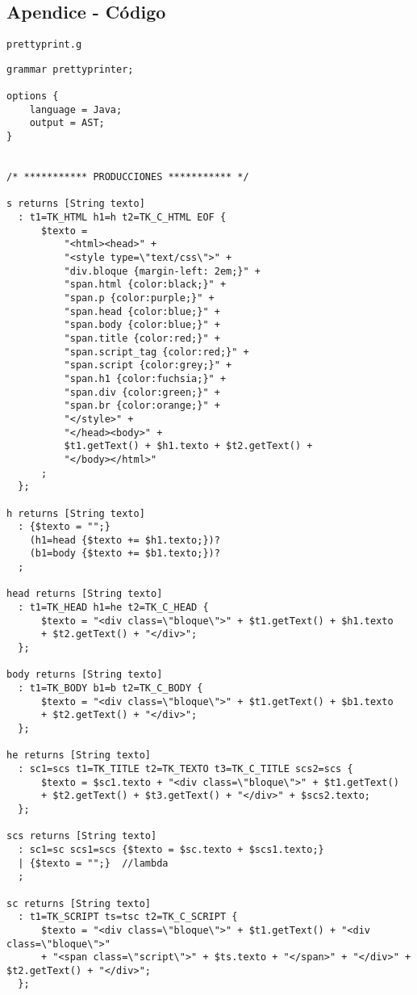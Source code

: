 \subsection{Apendice - Código}
\texttt{prettyprint.g}
{\tiny
\begin{verbatim}
grammar prettyprinter;

options {
    language = Java;
    output = AST;
}


/* *********** PRODUCCIONES *********** */

s returns [String texto]
  : t1=TK_HTML h1=h t2=TK_C_HTML EOF {
      $texto = 
          "<html><head>" + 
          "<style type=\"text/css\">" + 
          "div.bloque {margin-left: 2em;}" + 
          "span.html {color:black;}" +
          "span.p {color:purple;}" +
          "span.head {color:blue;}" +
          "span.body {color:blue;}" +
          "span.title {color:red;}" +
          "span.script_tag {color:red;}" +
          "span.script {color:grey;}" +
          "span.h1 {color:fuchsia;}" +
          "span.div {color:green;}" +
          "span.br {color:orange;}" +
          "</style>" +
          "</head><body>" +
          $t1.getText() + $h1.texto + $t2.getText() + 
          "</body></html>"
      ;
  };
  
h returns [String texto]
  : {$texto = "";} 
    (h1=head {$texto += $h1.texto;})? 
    (b1=body {$texto += $b1.texto;})?
  ;

head returns [String texto]
  : t1=TK_HEAD h1=he t2=TK_C_HEAD {
      $texto = "<div class=\"bloque\">" + $t1.getText() + $h1.texto 
      + $t2.getText() + "</div>";
  };

body returns [String texto]
  : t1=TK_BODY b1=b t2=TK_C_BODY {
      $texto = "<div class=\"bloque\">" + $t1.getText() + $b1.texto 
      + $t2.getText() + "</div>";
  };
  
he returns [String texto]
  : sc1=scs t1=TK_TITLE t2=TK_TEXTO t3=TK_C_TITLE scs2=scs {
      $texto = $sc1.texto + "<div class=\"bloque\">" + $t1.getText() 
      + $t2.getText() + $t3.getText() + "</div>" + $scs2.texto;
  };

scs returns [String texto]
  : sc1=sc scs1=scs {$texto = $sc.texto + $scs1.texto;}
  | {$texto = "";}  //lambda
  ; 

sc returns [String texto]
  : t1=TK_SCRIPT ts=tsc t2=TK_C_SCRIPT {
      $texto = "<div class=\"bloque\">" + $t1.getText() + "<div class=\"bloque\">"
      + "<span class=\"script\">" + $ts.texto + "</span>" + "</div>" + $t2.getText() + "</div>";
  };  


\end{verbatim}}
